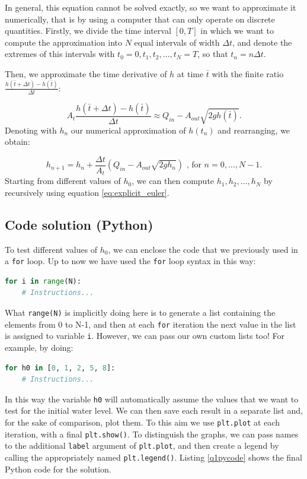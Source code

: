 \documentclass{article}
\newcommand{\py}[1]{\texttt{\lstinline!#1!}}
\begin{document}
In general, this equation cannot be solved exactly, so we want to approximate it numerically, that is by using a computer that can only operate on discrete quantities. Firstly, we divide the time interval $[0, T]$ in which we want to compute the approximation into $N$ equal intervals of width $\Delta t$, and denote the extremes of this intervals with $t_0=0, t_1,t_2,\dots, t_N =T$, so that $t_n = n\Delta t$.

Then, we approximate the time derivative of $h$ at time $\bar t$ with the finite ratio $\frac{h(\bar{t} +\Delta t) -h(\bar{t})}{\Delta t}$:

\begin{equation}
    A_t\frac{h(\bar{t} +\Delta t) -h(\bar{t})}{\Delta t} \approx Q_{in}-A_{out}\sqrt{2gh(\bar t)}.
\end{equation}
Denoting with $h_n$ our numerical approximation of $h(t_n)$ and rearranging, we obtain:

\begin{equation}
\label{eq:explicit_euler}
    h_{n+1}=h_n + \frac{\Delta t}{A_t}\left( Q_{in} - A_{out}\sqrt{2gh_n}\right)
    \text{ , for $n=0,\dots, N-1$}.
\end{equation}
Starting from different values of $h_0$, we can then compute $h_1,h_2,\dots, h_N$ by recursively using equation \eqref{eq:explicit_euler}.


\subsection{Code solution (Python)}
To test different values of $h_0$, we can enclose the code that we previously used in a \py{for} loop. Up to now we have used the \py{for} loop syntax in this way:
\begin{lstlisting}[language=Python]
for i in range(N):
    # Instructions...
\end{lstlisting}

What \py{range(N)} is implicitly doing here is to generate a list containing the elements from 0 to N-1, and then at each \py{for} iteration the next value in the list is assigned to variable \py{i}. However, we can pass our own custom lists too! For example, by doing:
\begin{lstlisting}[language=Python]
for h0 in [0, 1, 2, 5, 8]:
    # Instructions...
\end{lstlisting}

In this way the variable \py{h0} will automatically assume the values that we want to test for the initial water level. We can then save each result in a separate list and, for the sake of comparison, plot them. To this aim  we use \py{plt.plot} at each iteration, with a final \py{plt.show()}. To distinguish the graphs, we can pass  names to the additional \py{label} argument of \py{plt.plot}, and then create a legend by calling the appropriately named \py{plt.legend()}.
Listing \ref{q1pycode} shows the final Python code for the solution.
\end{document}
